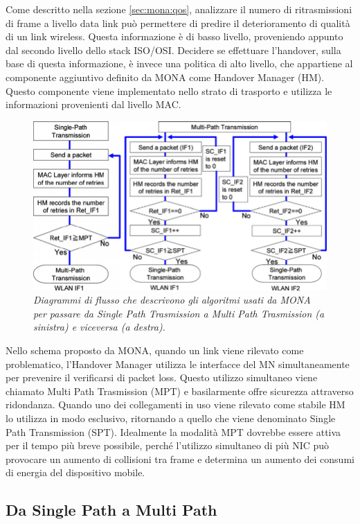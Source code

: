 \documentclass[12pt,a4paper,openright,twoside]{book}
\begin{document}
Come descritto nella sezione \ref{sec:mona:qos}, analizzare il numero
di ritrasmissioni di frame a livello data link può permettere di
predire il deterioramento di qualità di un link wireless. Questa
informazione è di basso livello, proveniendo appunto dal secondo
livello dello stack ISO/OSI. Decidere se effettuare l'handover, sulla
base di questa informazione, è invece una politica di alto livello,
che appartiene al componente aggiuntivo definito da MONA come Handover
Manager (HM). Questo componente viene implementato nello strato di
trasporto e utilizza le informazioni provenienti dal livello MAC.

\begin{figure}[tb]
  \centering
  \includegraphics[width=\textwidth]{img/mona-sp-mp}
  \caption{\em Diagrammi di flusso che descrivono gli algoritmi usati da
    MONA per passare da Single Path Trasmission a Multi Path Trasmission
    (a sinistra) e viceversa (a destra).}
  \label{fig:mona:sp-mp}
\end{figure}

Nello schema proposto da MONA, quando un link viene rilevato come
problematico, l'Handover Manager utilizza le interfacce del MN
simultaneamente per prevenire il verificarsi di packet loss. Questo
utilizzo simultaneo viene chiamato Multi Path Trasmission (MPT) e
basilarmente offre sicurezza attraverso ridondanza. Quando uno dei
collegamenti in uso viene rilevato come stabile HM lo utilizza in modo
esclusivo, ritornando a quello che viene denominato Single Path
Transmission (SPT). Idealmente la modalità MPT dovrebbe essere attiva
per il tempo più breve possibile, perché l'utilizzo simultaneo di più
NIC può provocare un aumento di collisioni tra frame e determina un
aumento dei consumi di energia del dispositivo mobile.

\subsection{Da Single Path a Multi Path}
\end{document}
